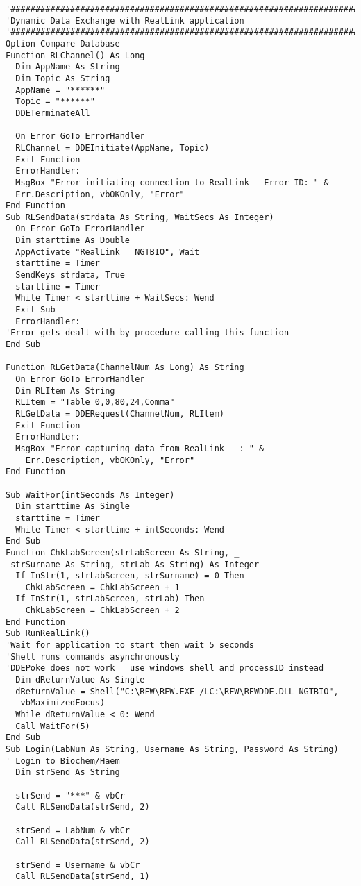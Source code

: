 \begin{lstlisting}
'#########################################################################
'Dynamic Data Exchange with RealLink application
'#########################################################################
Option Compare Database
Function RLChannel() As Long
  Dim AppName As String
  Dim Topic As String
  AppName = "******"
  Topic = "******"
  DDETerminateAll
  
  On Error GoTo ErrorHandler
  RLChannel = DDEInitiate(AppName, Topic)
  Exit Function
  ErrorHandler:
  MsgBox "Error initiating connection to RealLink   Error ID: " & _
  Err.Description, vbOKOnly, "Error"
End Function
Sub RLSendData(strdata As String, WaitSecs As Integer)
  On Error GoTo ErrorHandler
  Dim starttime As Double
  AppActivate "RealLink   NGTBIO", Wait
  starttime = Timer
  SendKeys strdata, True
  starttime = Timer
  While Timer < starttime + WaitSecs: Wend
  Exit Sub
  ErrorHandler:
'Error gets dealt with by procedure calling this function
End Sub
  
Function RLGetData(ChannelNum As Long) As String
  On Error GoTo ErrorHandler
  Dim RLItem As String
  RLItem = "Table 0,0,80,24,Comma"
  RLGetData = DDERequest(ChannelNum, RLItem)
  Exit Function
  ErrorHandler:
  MsgBox "Error capturing data from RealLink   : " & _ 
    Err.Description, vbOKOnly, "Error"
End Function
  
Sub WaitFor(intSeconds As Integer)
  Dim starttime As Single
  starttime = Timer
  While Timer < starttime + intSeconds: Wend
End Sub
Function ChkLabScreen(strLabScreen As String, _
 strSurname As String, strLab As String) As Integer
  If InStr(1, strLabScreen, strSurname) = 0 Then 
    ChkLabScreen = ChkLabScreen + 1
  If InStr(1, strLabScreen, strLab) Then 
    ChkLabScreen = ChkLabScreen + 2
End Function
Sub RunRealLink()
'Wait for application to start then wait 5 seconds
'Shell runs commands asynchronously
'DDEPoke does not work   use windows shell and processID instead
  Dim dReturnValue As Single
  dReturnValue = Shell("C:\RFW\RFW.EXE /LC:\RFW\RFWDDE.DLL NGTBIO",_
   vbMaximizedFocus)
  While dReturnValue < 0: Wend
  Call WaitFor(5)
End Sub
Sub Login(LabNum As String, Username As String, Password As String)
' Login to Biochem/Haem
  Dim strSend As String
  
  strSend = "***" & vbCr
  Call RLSendData(strSend, 2)
  
  strSend = LabNum & vbCr
  Call RLSendData(strSend, 2)
  
  strSend = Username & vbCr
  Call RLSendData(strSend, 1)
  

\end{lstlisting}
